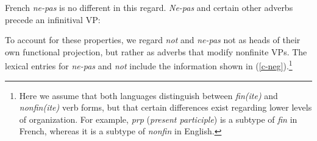 \documentclass[output=paper
                ,modfonts
		,nonflat
	        ,collection
	        ,collectionchapter
	        ,collectiontoclongg
 	        ,biblatex  
                ,babelshorthands
                ,newtxmath
                ,draftmode
                ,colorlinks, citecolor=brown 
]{./langsci/langscibook}
\begin{document}
{\begin{exe}
\begin{xlist}
\begin{exe}
\begin{xlist}
\eal\label{30}
\zl

\eal\label{31}
\zl

\noindent
French \textit{ne-pas} is no different in this regard.  \textit{Ne-pas} and
certain other adverbs precede an infinitival VP:

\eal
{}
\zl

To account for these properties, we regard \textit{not} and \textit{ne-pas} not as
heads of their own functional projection, but rather as adverbs that modify
nonfinite VPs. The lexical entries for \textit{ne-pas} and \textit{not} include the
information shown in (\ref{c-neg}).\footnote{Here we assume that both languages
distinguish between \textit{fin(ite)} and \textit{nonfin(ite)} verb forms, but that
certain differences exist regarding lower levels of organization. For example,
\emph{prp} (\emph{present participle}) is a subtype of \emph{fin} in French,
whereas it is a subtype of \emph{nonfin} in English.}

%


\end{xlist}
\end{exe}
\end{xlist}
\end{exe}}
\end{document}
